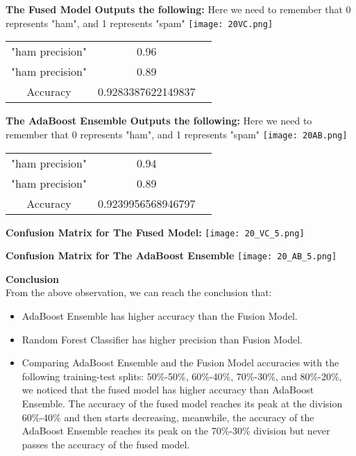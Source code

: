 \documentclass{article}
\begin{document}
\textbf{The Fused Model Outputs the following: }
Here we need to remember that 0 represents "ham", and 1 represents "spam"
\texttt{[image: 20VC.png]}
\begin{center}
\begin{tabular}{ |c|c|c| } 
 \hline
 "ham precision" & 0.96  \\ 
 "ham precision" & 0.89 \\ 
 Accuracy  & 0.9283387622149837 \\ 
 \hline
\end{tabular}
\end{center}

\textbf{The AdaBoost Ensemble Outputs the following: }
Here we need to remember that 0 represents "ham", and 1 represents "spam"
\texttt{[image: 20AB.png]}
\begin{center}
\begin{tabular}{ |c|c|c| } 
 \hline
 "ham precision" & 0.94  \\ 
 "ham precision" & 0.89 \\ 
 Accuracy  & 0.9239956568946797 \\ 
 \hline
\end{tabular}
\end{center}
\newpage
\centering
\textbf{Confusion Matrix for The Fused Model: }
\centering
\vspace{0.5cm}
\texttt{[image: 20\_VC\_5.png]}
\centering

\textbf{Confusion Matrix for The AdaBoost Ensemble}
\centering
\vspace{0.5cm}
\texttt{[image: 20\_AB\_5.png]}

\newpage
\textbf{Conclusion}
\\
From the above observation, we can reach the conclusion that: 
\begin{itemize}
    \item AdaBoost Ensemble has higher accuracy than the Fusion Model.
    \item Random Forest Classifier has higher precision than Fusion Model.
    \item Comparing AdaBoost Ensemble and the Fusion Model accuracies with the following training-test splits: 50\%-50\%, 60\%-40\%, 70\%-30\%, and 80\%-20\%, we noticed that the fused model has higher accuracy than AdaBoost Ensemble. The accuracy of the fused model reaches its peak at the division 60\%-40\% and then starts decreasing, meanwhile, the accuracy of the AdaBoost Ensemble reaches its peak on the 70\%-30\% division but never passes the accuracy of the fused model. 
\end{itemize}
\end{document}
